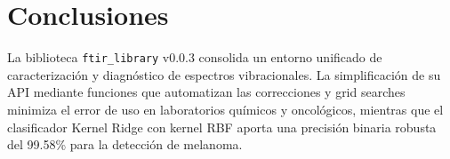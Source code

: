 \section{Conclusiones}
La biblioteca \texttt{ftir\_library} v0.0.3 consolida un entorno unificado de caracterización y diagnóstico de espectros vibracionales. La simplificación de su API mediante funciones que automatizan las correcciones y grid searches minimiza el error de uso en laboratorios químicos y oncológicos, mientras que el clasificador Kernel Ridge con kernel RBF aporta una precisión binaria robusta del 99.58\% para la detección de melanoma.

